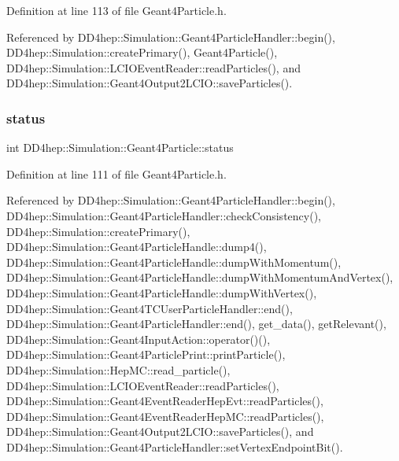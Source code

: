 Definition at line 113 of file Geant4\+Particle.\+h.



Referenced by D\+D4hep\+::\+Simulation\+::\+Geant4\+Particle\+Handler\+::begin(), D\+D4hep\+::\+Simulation\+::create\+Primary(), Geant4\+Particle(), D\+D4hep\+::\+Simulation\+::\+L\+C\+I\+O\+Event\+Reader\+::read\+Particles(), and D\+D4hep\+::\+Simulation\+::\+Geant4\+Output2\+L\+C\+I\+O\+::save\+Particles().

\hypertarget{class_d_d4hep_1_1_simulation_1_1_geant4_particle_af9637a505c345dfe4a16309aa80ba89d}{}\label{class_d_d4hep_1_1_simulation_1_1_geant4_particle_af9637a505c345dfe4a16309aa80ba89d} 
\subsubsection{\texorpdfstring{status}{status}}
{\footnotesize\ttfamily int D\+D4hep\+::\+Simulation\+::\+Geant4\+Particle\+::status}



Definition at line 111 of file Geant4\+Particle.\+h.



Referenced by D\+D4hep\+::\+Simulation\+::\+Geant4\+Particle\+Handler\+::begin(), D\+D4hep\+::\+Simulation\+::\+Geant4\+Particle\+Handler\+::check\+Consistency(), D\+D4hep\+::\+Simulation\+::create\+Primary(), D\+D4hep\+::\+Simulation\+::\+Geant4\+Particle\+Handle\+::dump4(), D\+D4hep\+::\+Simulation\+::\+Geant4\+Particle\+Handle\+::dump\+With\+Momentum(), D\+D4hep\+::\+Simulation\+::\+Geant4\+Particle\+Handle\+::dump\+With\+Momentum\+And\+Vertex(), D\+D4hep\+::\+Simulation\+::\+Geant4\+Particle\+Handle\+::dump\+With\+Vertex(), D\+D4hep\+::\+Simulation\+::\+Geant4\+T\+C\+User\+Particle\+Handler\+::end(), D\+D4hep\+::\+Simulation\+::\+Geant4\+Particle\+Handler\+::end(), get\+\_\+data(), get\+Relevant(), D\+D4hep\+::\+Simulation\+::\+Geant4\+Input\+Action\+::operator()(), D\+D4hep\+::\+Simulation\+::\+Geant4\+Particle\+Print\+::print\+Particle(), D\+D4hep\+::\+Simulation\+::\+Hep\+M\+C\+::read\+\_\+particle(), D\+D4hep\+::\+Simulation\+::\+L\+C\+I\+O\+Event\+Reader\+::read\+Particles(), D\+D4hep\+::\+Simulation\+::\+Geant4\+Event\+Reader\+Hep\+Evt\+::read\+Particles(), D\+D4hep\+::\+Simulation\+::\+Geant4\+Event\+Reader\+Hep\+M\+C\+::read\+Particles(), D\+D4hep\+::\+Simulation\+::\+Geant4\+Output2\+L\+C\+I\+O\+::save\+Particles(), and D\+D4hep\+::\+Simulation\+::\+Geant4\+Particle\+Handler\+::set\+Vertex\+Endpoint\+Bit().

